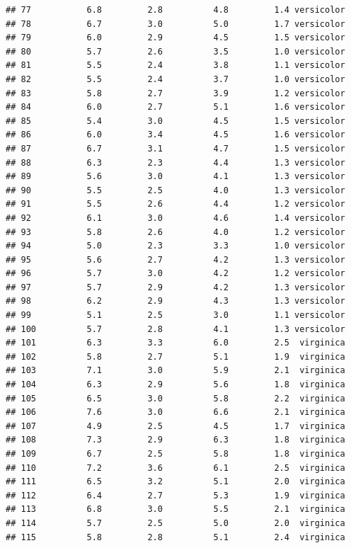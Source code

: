 \documentclass[
]{book}
\begin{document}
\begin{verbatim}
## 77           6.8         2.8          4.8         1.4 versicolor
## 78           6.7         3.0          5.0         1.7 versicolor
## 79           6.0         2.9          4.5         1.5 versicolor
## 80           5.7         2.6          3.5         1.0 versicolor
## 81           5.5         2.4          3.8         1.1 versicolor
## 82           5.5         2.4          3.7         1.0 versicolor
## 83           5.8         2.7          3.9         1.2 versicolor
## 84           6.0         2.7          5.1         1.6 versicolor
## 85           5.4         3.0          4.5         1.5 versicolor
## 86           6.0         3.4          4.5         1.6 versicolor
## 87           6.7         3.1          4.7         1.5 versicolor
## 88           6.3         2.3          4.4         1.3 versicolor
## 89           5.6         3.0          4.1         1.3 versicolor
## 90           5.5         2.5          4.0         1.3 versicolor
## 91           5.5         2.6          4.4         1.2 versicolor
## 92           6.1         3.0          4.6         1.4 versicolor
## 93           5.8         2.6          4.0         1.2 versicolor
## 94           5.0         2.3          3.3         1.0 versicolor
## 95           5.6         2.7          4.2         1.3 versicolor
## 96           5.7         3.0          4.2         1.2 versicolor
## 97           5.7         2.9          4.2         1.3 versicolor
## 98           6.2         2.9          4.3         1.3 versicolor
## 99           5.1         2.5          3.0         1.1 versicolor
## 100          5.7         2.8          4.1         1.3 versicolor
## 101          6.3         3.3          6.0         2.5  virginica
## 102          5.8         2.7          5.1         1.9  virginica
## 103          7.1         3.0          5.9         2.1  virginica
## 104          6.3         2.9          5.6         1.8  virginica
## 105          6.5         3.0          5.8         2.2  virginica
## 106          7.6         3.0          6.6         2.1  virginica
## 107          4.9         2.5          4.5         1.7  virginica
## 108          7.3         2.9          6.3         1.8  virginica
## 109          6.7         2.5          5.8         1.8  virginica
## 110          7.2         3.6          6.1         2.5  virginica
## 111          6.5         3.2          5.1         2.0  virginica
## 112          6.4         2.7          5.3         1.9  virginica
## 113          6.8         3.0          5.5         2.1  virginica
## 114          5.7         2.5          5.0         2.0  virginica
## 115          5.8         2.8          5.1         2.4  virginica

\end{verbatim}
\end{document}
